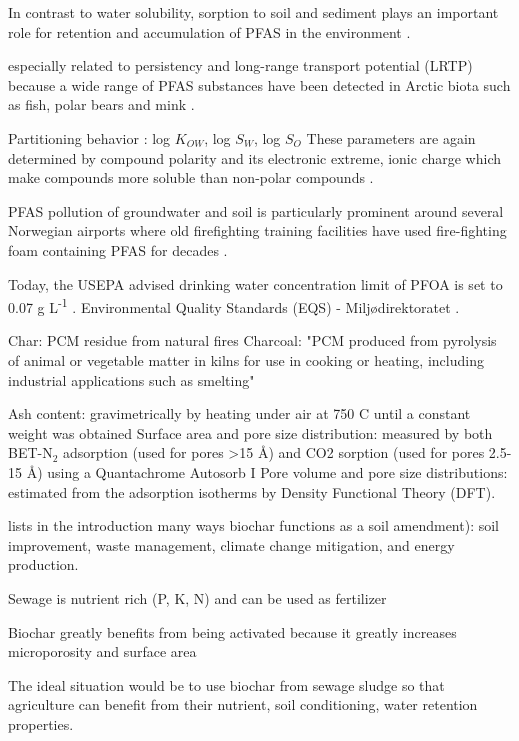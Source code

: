  In contrast to water solubility, sorption to soil and sediment plays an important role for retention and accumulation of PFAS in the environment \citep{li2018,LehmannAndJoseph2015,Cornelissen2005}.
 
   \citep{MD2016workshop} \citep{MD2020EQS}
especially related to persistency and long-range transport potential (LRTP) \citep{MD2020EQS} because a wide range of PFAS substances have been detected in Arctic biota such as fish, polar bears and mink \citep{Schlabach2017}.

Partitioning behavior \citep{wang2011physchem}: log $K_{OW}$, log $S_W$, log $S_O$ These parameters are again determined by compound polarity and its electronic extreme, ionic charge which make compounds more soluble than non-polar compounds \citep{Reemtsma2016}.

PFAS pollution of groundwater and soil is particularly prominent around several Norwegian airports where old firefighting training facilities have used fire-fighting foam containing PFAS for decades .

Today, the USEPA advised drinking water concentration limit of PFOA is set to 0.07 \textmu g L\textsuperscript{-1} \citep{us2016drinking}. Environmental Quality Standards (EQS) - Miljødirektoratet \citep{EC2020PFAS}.

Char: PCM residue from natural fires
Charcoal: "PCM produced from pyrolysis of animal or vegetable matter in kilns for use in cooking or heating, including industrial applications such as smelting"

Ash content: gravimetrically by heating under air at 750 \textdegree C until a constant weight was obtained
Surface area and pore size distribution: measured by both BET-N$_2$ adsorption (used for pores >15 Å) and CO2 sorption (used for pores 2.5-15 Å) using a Quantachrome Autosorb I
Pore volume and pore size distributions: estimated from the adsorption isotherms by Density Functional Theory (DFT).

lists in the introduction many ways biochar functions as a soil amendment): soil improvement, waste management, climate change mitigation, and energy production.
 
Sewage is nutrient rich (P, K, N) and can be used as fertilizer
 
Biochar greatly benefits from being activated because it greatly increases microporosity and surface area
  
The ideal situation would be to use biochar from sewage sludge so that agriculture can benefit from their nutrient, soil conditioning, water retention properties.

